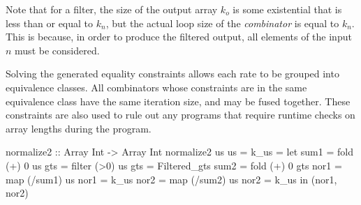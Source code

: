        {}

\vspace{1em}


\vspace{1em}


\vspace{1em}


Note that for a filter, the size of the output array $k_o$ is some existential that is less than or equal to $k_n$, but the actual loop size of the \emph{combinator} is equal to $k_n$.
This is because, in order to produce the filtered output, all elements of the input $n$ must be considered.

\vspace{1em}


\vspace{1em}


\vspace{1em}


\vspace{1em}

Solving the generated equality constraints allows each rate to be grouped into equivalence classes.
All combinators whose constraints are in the same equivalence class have the same iteration size, and may be fused together.
These constraints are also used to rule out any programs that require runtime checks on array lengths during the program.


\begin{code}
 normalize2 :: Array Int -> Array Int
 normalize2 us                   {us   = k_us}
  = let sum1 = fold   (+) 0 us   
        gts  = filter (>0)  us   {gts  = Filtered_gts}
        sum2 = fold   (+) 0 gts   
        nor1 = map  (/sum1) us   {nor1 = k_us}
        nor2 = map  (/sum2) us   {nor2 = k_us}
    in (nor1, nor2)
\end{code}

